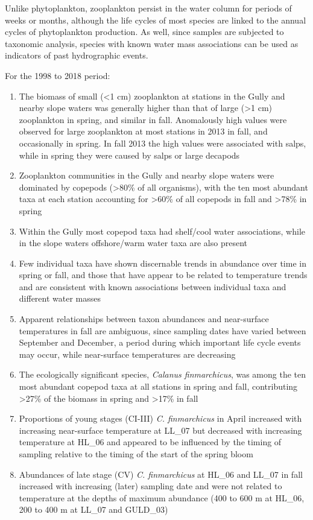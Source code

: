 \documentclass[12pt]{article}\usepackage[]{graphicx}\usepackage[]{color}
\begin{document}
Unlike phytoplankton, zooplankton persist in the water column for periods of weeks or months, although the life cycles of most species are linked to the annual cycles of phytoplankton production. As well, since samples are subjected to taxonomic analysis, species with known water mass associations can be used as indicators of past hydrographic events.

For the 1998 to 2018 period:
\begin{enumerate}
\def\labelenumi{\arabic{enumi}.}

\item
  The biomass of small (\textless1 cm) zooplankton at stations in the Gully and nearby slope waters was generally higher than that of large (\textgreater1 cm) zooplankton in spring, and similar in fall. Anomalously high values were observed for large zooplankton at most stations in 2013 in fall, and occasionally in spring. In fall 2013 the high values were associated with salps, while in spring they were caused by salps or large decapods
\item
  Zooplankton communities in the Gully and nearby slope waters were dominated by copepods (\textgreater80\% of all organisms), with the ten most abundant taxa at each station accounting for \textgreater60\% of all copepods in fall and \textgreater78\% in spring
\item
  Within the Gully most copepod taxa had shelf/cool water associations, while in the slope waters offshore/warm water taxa are also present
\item
  Few individual taxa have shown discernable trends in abundance over time in spring or fall, and those that have appear to be related to temperature trends and are consistent with known associations between individual taxa and different water masses
\item
  Apparent relationships between taxon abundances and near-surface temperatures in fall are ambiguous, since sampling dates have varied between September and December, a period during which important life cycle events may occur, while near-surface temperatures are decreasing
\item
  The ecologically significant species, \emph{Calanus finmarchicus}, was among the ten most abundant copepod taxa at all stations in spring and fall, contributing \textgreater27\% of the biomass in spring and \textgreater17\% in fall
\item
  Proportions of young stages (CI-III) \emph{C. finmarchicus} in April increased with increasing near-surface temperature at LL\_07 but decreased with increasing temperature at HL\_06 and appeared to be influenced by the timing of sampling relative to the timing of the start of the spring bloom
\item
  Abundances of late stage (CV) \emph{C. finmarchicus} at HL\_06 and LL\_07 in fall increased with increasing (later) sampling date and were not related to temperature at the depths of maximum abundance (400 to 600 m at HL\_06, 200 to 400 m at LL\_07 and GULD\_03)
\end{enumerate}
\end{document}
